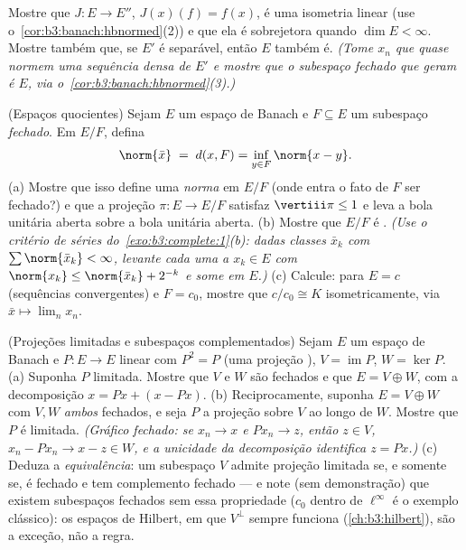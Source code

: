 \begin{exercise}[$\star\star$]\label{exo:b3:banach:10}
Mostre que $J \colon E \to E''$, $J(x)(f) = f(x)$, é uma isometria linear (use
o~\cref{cor:b3:banach:hbnormed}(2)) e que ela é sobrejetora quando $\dim E < \infty$. Mostre também
que, se $E'$ é separável, então $E$ também é. \emph{(Tome
$x_n$ que quase normem uma sequência densa de $E'$ e mostre que o
subespaço fechado que geram é $E$, via o~\cref{cor:b3:banach:hbnormed}(3).)}
\end{exercise}

\begin{exercise}[$\star\star$]\label{exo:b3:banach:11}
(Espaços quocientes) Sejam $E$ um espaço de Banach e $F \subseteq
E$ um
subespaço \emph{fechado}. Em $E/F$, defina
\[
\norm{\bar x} \;=\; d(x, F) = \inf_{y\in F}\norm{x - y} .
\]
(a) Mostre que isso define uma \emph{norma} em $E/F$ (onde entra o
fato de $F$ ser fechado?) e que a projeção $\pi
\colon E \to E/F$ satisfaz $\vertiii\pi \leq 1$ e
leva a bola unitária aberta sobre a bola unitária aberta.
(b) Mostre que $E/F$ é . \emph{(Use o critério de séries
do~\cref{exo:b3:complete:1}(b): dadas classes $\bar x_k$ com $\sum\norm{\bar x_k} < \infty$, levante cada uma a
$x_k \in E$ com $\norm{x_k} \leq \norm{\bar x_k} + 2^{-k}$ e some em $E$.)}
(c) Calcule: para $E = c$ (sequências convergentes) e $F =
c_0$, mostre
que $c/c_0 \cong K$ isometricamente, via $\bar x \mapsto
\lim_nx_n$.
\end{exercise}

\begin{exercise}[$\star\star$]\label{exo:b3:banach:12}
(Projeções limitadas e subespaços complementados) Sejam $E$ um
espaço de Banach e $P \colon E \to E$ linear com $P^2 = P$ (uma projeção ),
$V = \operatorname{im}P$, $W =
\ker P$.
(a) Suponha $P$ limitada. Mostre que $V$ e $W$ são fechados e
que $E = V \oplus W$, com a decomposição $x = Px + (x -
Px)$.
(b) Reciprocamente, suponha $E = V \oplus W$ com $V,
W$ \emph{ambos} fechados, e
seja $P$ a projeção sobre $V$ ao longo de $W$. Mostre que
$P$ é limitada. \emph{(Gráfico fechado: se $x_n \to x$ e $Px_n \to z$, então
$z \in V$, $x_n - Px_n \to x - z \in
W$, e a unicidade da decomposição identifica $z =
Px$.)}
(c) Deduza a \emph{equivalência}: um subespaço $V$ admite projeção
limitada se, e somente se, é fechado e tem complemento 
fechado --- e note (sem demonstração) que existem subespaços fechados
sem essa propriedade ($c_0$ dentro de $\ell^\infty$ é o exemplo clássico):
os espaços de Hilbert, em que $V^\perp$ sempre funciona (\cref{ch:b3:hilbert}), são
a exceção, não a regra.
\end{exercise}

